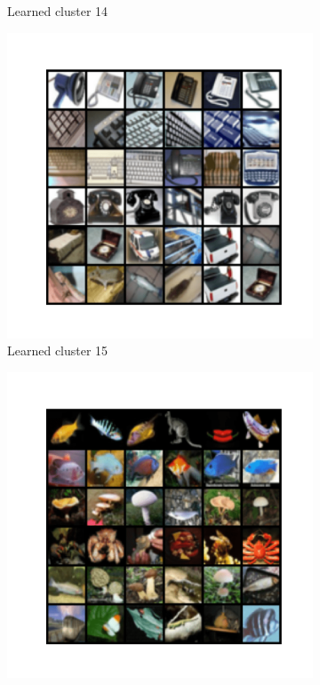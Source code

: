 \documentclass[10pt,twocolumn,letterpaper]{article}
\begin{document}
\begin{figure}
\begin{subfigure}{0.32\textwidth}
       \caption{Learned cluster 14}
     \end{subfigure}
     \hfill
     \begin{subfigure}{0.32\textwidth}
       \includegraphics[width=\linewidth,trim={1cm 2cm 1cm 2cm},clip]{figures/experiments/cifar100_cluster/nearest_class14.png}
       \caption{Learned cluster 15}
     \end{subfigure}
     \hfill
     \begin{subfigure}{0.32\textwidth}
       \includegraphics[width=\linewidth,trim={1cm 2cm 1cm 2cm},clip]{figures/experiments/cifar100_cluster/nearest_class15.png}

\end{subfigure}
\end{figure}
\end{document}
